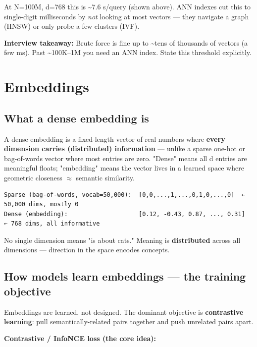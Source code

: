 \documentclass[11pt]{article}
\begin{document}
At N=100M, d=768 this is \textasciitilde7.6 s/query (shown above). ANN indexes cut this to single-digit milliseconds by \emph{not} looking at most vectors --- they navigate a graph (HNSW) or only probe a few clusters (IVF).

\textbf{Interview takeaway:} Brute force is fine up to \textasciitilde tens of thousands of vectors (a few ms). Past \textasciitilde100K--1M you need an ANN index. State this threshold explicitly.

\section{Embeddings}\label{embeddings}

\subsection{What a dense embedding is}\label{what-a-dense-embedding-is}

A dense embedding is a fixed-length vector of real numbers where \textbf{every dimension carries (distributed) information} --- unlike a sparse one-hot or bag-of-words vector where most entries are zero. "Dense" means all d entries are meaningful floats; "embedding" means the vector lives in a learned space where geometric closeness \(\approx\) semantic similarity.

\setcodelang{}

\begin{verbatim}
Sparse (bag-of-words, vocab=50,000):  [0,0,...,1,...,0,1,0,...,0]  ← 50,000 dims, mostly 0
Dense (embedding):                    [0.12, -0.43, 0.87, ..., 0.31]  ← 768 dims, all informative
\end{verbatim}

No single dimension means "is about cats." Meaning is \textbf{distributed} across all dimensions --- direction in the space encodes concepts.

\subsection{How models learn embeddings --- the training objective}\label{how-models-learn-embeddings--the-training-objective}

Embeddings are learned, not designed. The dominant objective is \textbf{contrastive learning}: pull semantically-related pairs together and push unrelated pairs apart.

\textbf{Contrastive / InfoNCE loss (the core idea):}
\end{document}
